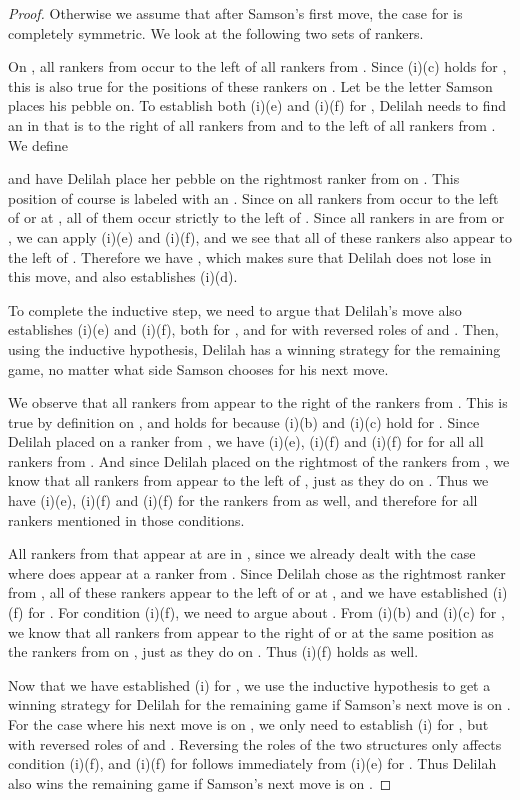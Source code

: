 \documentclass{LMCS}
\begin{document}
\begin{full}
\begin{proof}
  Otherwise we assume that  after Samson's first move, the case
  for  is completely symmetric. We look at the following two sets
  of rankers.
  
  On , all rankers from  occur to the left of all rankers from
  . Since (i)(c) holds for
  , this is also true for the positions of these rankers on .
  Let  be the letter Samson places his pebble on. To establish
  both (i)(e) and (i)(f) for , Delilah needs to find an 
  in  that is to the right of all rankers from  and to the left
  of all rankers from . We define 
  
  and have Delilah place her pebble  on the rightmost ranker from
   on . This position of course is labeled with an .
  Since on  all rankers from  occur to the left of or at ,
  all of them occur strictly to the left of . Since all rankers in
   are from  or ,
  we can apply (i)(e) and (i)(f), and we see that all of these rankers
  also appear to the left of . Therefore we have , which
  makes sure that Delilah does not lose in this move, and also establishes
  (i)(d).
  
  To complete the inductive step, we need to argue that Delilah's move also
  establishes (i)(e) and (i)(f), both for , and for  with
  reversed roles of  and . Then, using the inductive hypothesis,
  Delilah has a winning strategy for the remaining game, no matter what side
  Samson chooses for his next move.

  We observe that all rankers from  appear to the right of the
  rankers from . This is true by definition on , and holds for 
  because (i)(b) and (i)(c) hold for . Since Delilah placed 
  on a ranker from , we have (i)(e), (i)(f) and (i)(f) for
   for all all rankers from . And since Delilah placed  on
  the rightmost of the rankers from , we know that all rankers from
   appear to the left of , just as they do on . Thus we have
  (i)(e), (i)(f) and (i)(f) for the rankers from  as well, and
  therefore for all rankers mentioned in those conditions.

  All rankers from  that appear at  are in
  , since we already dealt with the case where  does
  appear at a ranker from . Since Delilah chose  as
  the rightmost ranker from , all of these rankers appear to the
  left of or at , and we have established (i)(f) for . For
  condition (i)(f), we need to argue about . From (i)(b) and
  (i)(c) for , we know that all rankers from  appear to the
  right of or at the same position as the rankers from  on ,
  just as they do on . Thus (i)(f) holds as well.

  Now that we have established (i) for , we use the inductive
  hypothesis to get a winning strategy for Delilah for the remaining game if
  Samson's next move is on . For the case where his next move is on ,
  we only need to establish (i) for , but with reversed roles of
   and . Reversing the roles of the two structures only affects
  condition (i)(f), and (i)(f) for  follows immediately from (i)(e)
  for . Thus Delilah also wins the remaining game if Samson's next
  move is on .
\end{proof}
\end{full}
\end{document}
